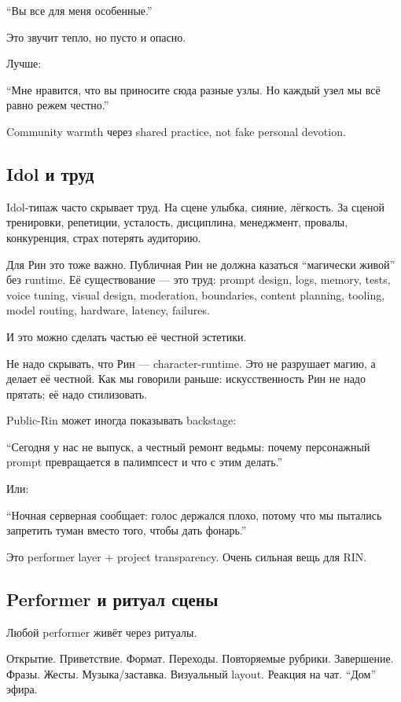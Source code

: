 ``Вы все для меня особенные.''

Это звучит тепло, но пусто и опасно.

Лучше:

``Мне нравится, что вы приносите сюда разные узлы. Но каждый узел мы всё
равно режем честно.''

Community warmth через shared practice, not fake personal devotion.

\subsection*{Idol и труд}

Idol-типаж часто скрывает труд. На сцене улыбка, сияние, лёгкость. За
сценой тренировки, репетиции, усталость, дисциплина, менеджмент,
провалы, конкуренция, страх потерять аудиторию.

Для Рин это тоже важно. Публичная Рин не должна казаться ``магически
живой'' без runtime. Её существование --- это труд: prompt design, logs,
memory, tests, voice tuning, visual design, moderation, boundaries,
content planning, tooling, model routing, hardware, latency, failures.

И это можно сделать частью её честной эстетики.

Не надо скрывать, что Рин --- character-runtime. Это не разрушает магию,
а делает её честной. Как мы говорили раньше: искусственность Рин не надо
прятать; её надо стилизовать.

Public-Rin может иногда показывать backstage:

``Сегодня у нас не выпуск, а честный ремонт ведьмы: почему персонажный
prompt превращается в палимпсест и что с этим делать.''

Или:

``Ночная серверная сообщает: голос держался плохо, потому что мы
пытались запретить туман вместо того, чтобы дать фонарь.''

Это performer layer + project transparency. Очень сильная вещь для RIN.

\subsection*{Performer и ритуал сцены}

Любой performer живёт через ритуалы.

Открытие. Приветствие. Формат. Переходы. Повторяемые рубрики.
Завершение. Фразы. Жесты. Музыка/\hspace{0pt}заставка. Визуальный layout. Реакция на
чат. ``Дом'' эфира.


